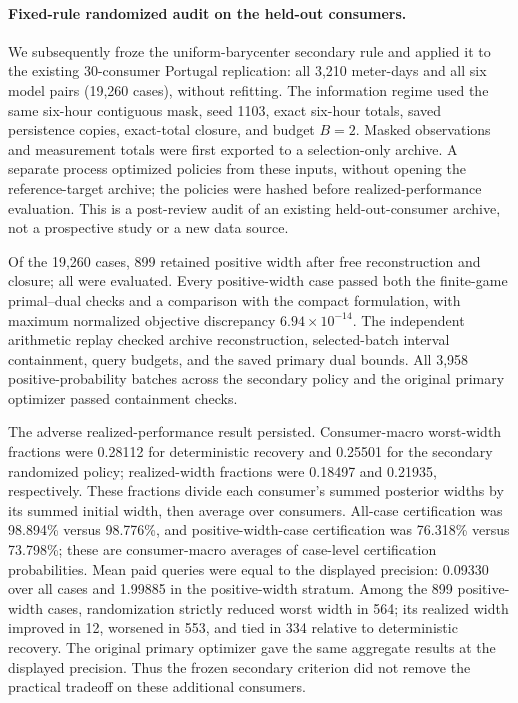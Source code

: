 \paragraph{Fixed-rule randomized audit on the held-out consumers.}
We subsequently froze the uniform-barycenter secondary rule and applied it to the existing 30-consumer Portugal replication: all 3,210 meter-days and all six model pairs (19,260 cases), without refitting. The information regime used the same six-hour contiguous mask, seed 1103, exact six-hour totals, saved persistence copies, exact-total closure, and budget $B=2$. Masked observations and measurement totals were first exported to a selection-only archive. A separate process optimized policies from these inputs, without opening the reference-target archive; the policies were hashed before realized-performance evaluation. This is a post-review audit of an existing held-out-consumer archive, not a prospective study or a new data source.

Of the 19,260 cases, 899 retained positive width after free reconstruction and closure; all were evaluated. Every positive-width case passed both the finite-game primal--dual checks and a comparison with the compact formulation, with maximum normalized objective discrepancy $6.94\times10^{-14}$. The independent arithmetic replay checked archive reconstruction, selected-batch interval containment, query budgets, and the saved primary dual bounds. All 3,958 positive-probability batches across the secondary policy and the original primary optimizer passed containment checks.

The adverse realized-performance result persisted. Consumer-macro worst-width fractions were 0.28112 for deterministic recovery and 0.25501 for the secondary randomized policy; realized-width fractions were 0.18497 and 0.21935, respectively. These fractions divide each consumer's summed posterior widths by its summed initial width, then average over consumers. All-case certification was 98.894\% versus 98.776\%, and positive-width-case certification was 76.318\% versus 73.798\%; these are consumer-macro averages of case-level certification probabilities. Mean paid queries were equal to the displayed precision: 0.09330 over all cases and 1.99885 in the positive-width stratum. Among the 899 positive-width cases, randomization strictly reduced worst width in 564; its realized width improved in 12, worsened in 553, and tied in 334 relative to deterministic recovery. The original primary optimizer gave the same aggregate results at the displayed precision. Thus the frozen secondary criterion did not remove the practical tradeoff on these additional consumers.
